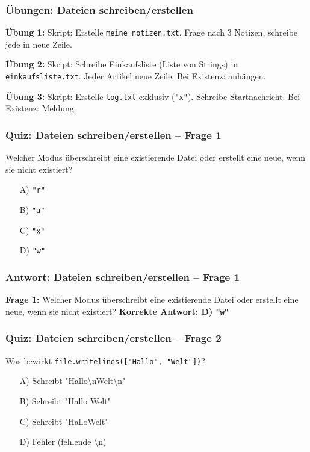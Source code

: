 \documentclass[aspectratio=169]{beamer} %
\begin{document}
\begin{frame}[fragile]
\frametitle{Übungen: Dateien schreiben/erstellen}
\textbf{Übung 1:}
Skript: Erstelle \texttt{meine\_notizen.txt}. Frage nach 3 Notizen, schreibe jede in neue Zeile.
\vspace{0.5em}

\textbf{Übung 2:}
Skript: Schreibe Einkaufsliste (Liste von Strings) in \texttt{einkaufsliste.txt}. Jeder Artikel neue Zeile. Bei Existenz: anhängen.
\vspace{0.5em}

\textbf{Übung 3:}
Skript: Erstelle \texttt{log.txt} exklusiv (\texttt{"x"}). Schreibe Startnachricht. Bei Existenz: Meldung.
\end{frame}

\begin{frame}[fragile]
\frametitle{Quiz: Dateien schreiben/erstellen – Frage 1}
Welcher Modus überschreibt eine existierende Datei oder erstellt eine neue, wenn sie nicht existiert?
\begin{enumerate}
    \item[A)] \texttt{"r"}
    \item[B)] \texttt{"a"}
    \item[C)] \texttt{"x"}
    \item[D)] \texttt{"w"}
\end{enumerate}
\end{frame}

\begin{frame}[fragile]
\frametitle{Antwort: Dateien schreiben/erstellen – Frage 1}
\textbf{Frage 1:} Welcher Modus überschreibt eine existierende Datei oder erstellt eine neue, wenn sie nicht existiert?
\vspace{1em}
\textbf{Korrekte Antwort: D) \texttt{"w"}}
\end{frame}

\begin{frame}[fragile]
\frametitle{Quiz: Dateien schreiben/erstellen – Frage 2}
Was bewirkt \texttt{file.writelines(["Hallo", "Welt"])}?
\begin{enumerate}
    \item[A)] Schreibt "Hallo\textbackslash{}nWelt\textbackslash{}n"
    \item[B)] Schreibt "Hallo Welt"
    \item[C)] Schreibt "HalloWelt"
    \item[D)] Fehler (fehlende \textbackslash{}n)
\end{enumerate}
\end{frame}
\end{document}
